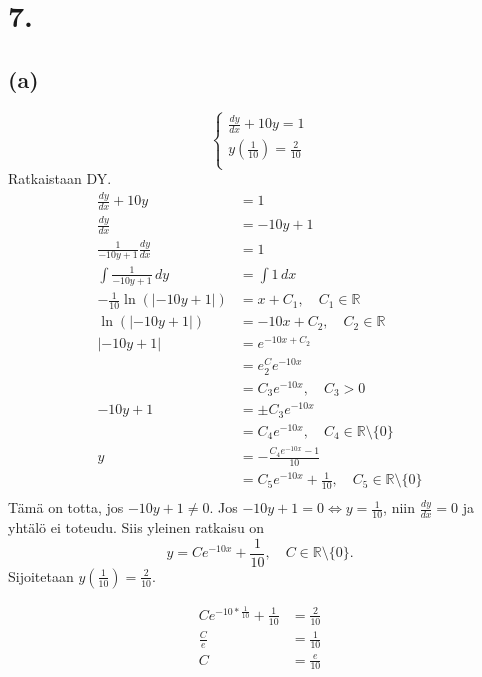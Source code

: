 \documentclass{article}
\begin{document}
\section*{7.}

\subsection*{(a)}
\[
  \begin{cases}
    \frac{dy}{dx} + 10y = 1 \\
    y(\frac{1}{10}) = \frac{2}{10} \\
  \end{cases}
\]
Ratkaistaan DY.
\begin{align*}
  \frac{dy}{dx} + 10y &= 1 \\
  \frac{dy}{dx} &= -10y + 1 \\
  \frac{1}{-10y + 1} \frac{dy}{dx} &= 1 \\
  \int \frac{1}{-10y + 1} \,dy &= \int 1 \,dx \\
  - \frac{1}{10} \ln(|-10y + 1|) &= x + C_1, \quad C_1 \in \mathbb{R} \\
  \ln(|-10y + 1|) &= -10x + C_2, \quad C_2 \in \mathbb{R} \\
  |-10y + 1| &= e^{-10x + C_2} \\
             &= e^C_2 e^{-10x} \\
             &= C_3 e^{-10x}, \quad C_3 > 0 \\
  -10y + 1 &= \pm C_3 e^{-10x} \\
           &= C_4 e^{-10x}, \quad C_4 \in \mathbb{R} \setminus \{0\} \\
  y &= -\frac{C_4 e^{-10x} - 1}{10} \\
    &= C_5 e^{-10x} + \frac{1}{10}, \quad C_5 \in \mathbb{R} \setminus\{0\} \\
\end{align*}
Tämä on totta, jos $-10y + 1 \neq 0$.
Jos $-10y + 1 = 0 \iff y = \frac{1}{10}$, niin
$\frac{dy}{dx} = 0$ ja yhtälö ei toteudu.
Siis yleinen ratkaisu on
\[
  y = C e^{-10x} + \frac{1}{10}, \quad C \in \mathbb{R} \setminus\{0\}.
\]
Sijoitetaan $y(\frac{1}{10}) = \frac{2}{10}$.

\begin{align*}
  C e^{-10 * \frac{1}{10}} + \frac{1}{10} &= \frac{2}{10} \\
  \frac{C}{e} &= \frac{1}{10} \\
  C &= \frac{e}{10} \\
\end{align*}
\end{document}
